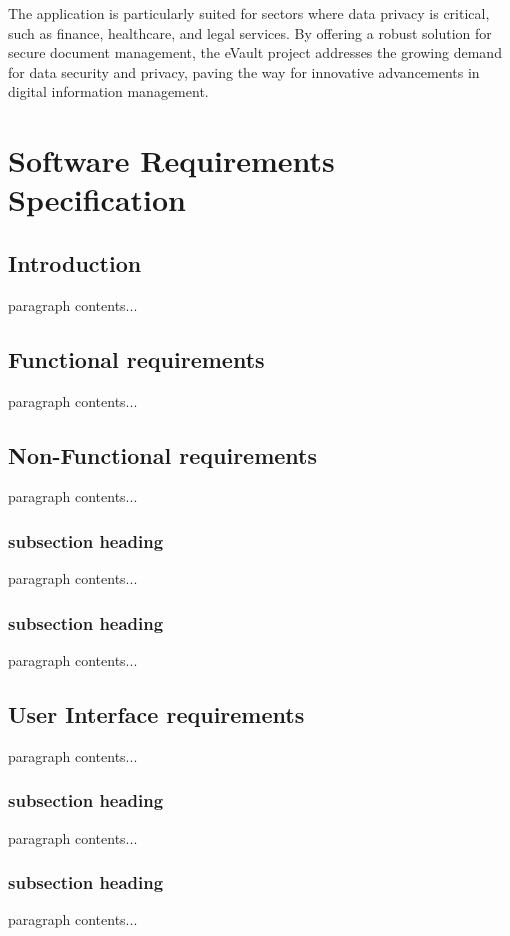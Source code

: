 \documentclass[12pt,a4paper]{report}
\begin{document}
The application is particularly suited for sectors where data privacy is critical, such as finance, healthcare, and legal services. By offering a robust solution for secure document management, the eVault project addresses the growing demand for data security and privacy, paving the way for innovative advancements in digital information management.


\chapter{Software Requirements Specification}
\section{Introduction}

paragraph contents... 

\section{Functional requirements}
paragraph contents... 

\section{Non-Functional requirements}
paragraph contents... 

\subsection{subsection heading}
paragraph contents... 


\subsection{subsection heading}
paragraph contents... 
\section{User Interface requirements}
paragraph contents... 
\subsection{subsection heading}
paragraph contents... 
\subsection{subsection heading}
paragraph contents... 
\end{document}
